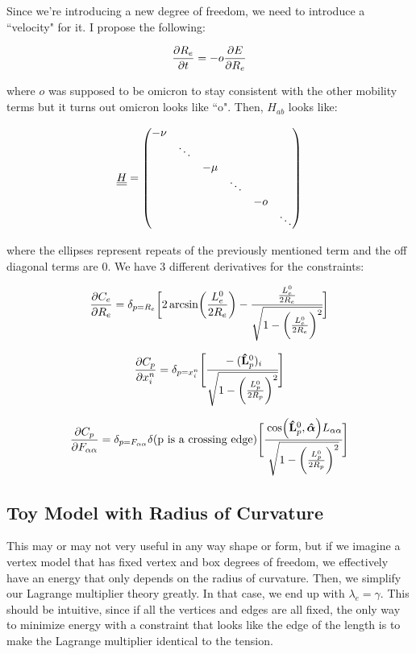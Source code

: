 \documentclass[12pt]{article}
\begin{document}
Since we're introducing a new degree of freedom, we need to introduce a ``velocity" for it. I propose the following:
\begin{center}
\begin{equation}
\pdv{R_e}{t} = -o \pdv{E}{R_e}
\end{equation}
\end{center}
where $o$ was supposed to be omicron to stay consistent with the other mobility terms but it turns out omicron looks like ``o". Then, $H_{ab}$ looks like:
\begin{center}
\begin{equation}
\underline{\underline{H}} = \mqty(\dmat{-\nu, \ddots, -\mu, \ddots, -o, \ddots})
\end{equation}
\end{center}
where the ellipses represent repeats of the previously mentioned term and the off diagonal terms are $0$. We have 3 different derivatives for the constraints:
\begin{center}
\begin{equation}
\pdv{C_e}{R_e} = \delta_{p = R_e} \bigg[2 \arcsin(\frac{L_e^0}{2 R_e}) - \cfrac{\frac{L_e^0}{2 R_e}}{\sqrt{1-\bigg(\frac{L_e^0}{2 R_e}\bigg)^2}}\bigg]
\end{equation}
\end{center}
\begin{center}
\begin{equation}
\pdv{C_p}{x_i^n} = \delta_{p = x_i^n} \Bigg[\cfrac{-(\vu{L}_p^0)_i}{\sqrt{1-\bigg(\frac{L_p^0}{2 R_p}\bigg)^2}}\Bigg]
\end{equation}
\end{center}
\begin{center}
\begin{equation}
\pdv{C_p}{F_{\alpha\alpha}} = \delta_{p=F_{\alpha\alpha}} \delta(\text{p is a crossing edge})\Bigg[\cfrac{\cos(\vu{L}_p^0, \vu*{\alpha}) L_{\alpha\alpha}}{\sqrt{1-\bigg(\frac{L_p^0}{2 R_p}\bigg)^2}}\Bigg]
\end{equation}
\end{center}
\subsection{Toy Model with Radius of Curvature}
This may or may not very useful in any way shape or form, but if we imagine a vertex model that has fixed vertex and box degrees of freedom, we effectively have an energy that only depends on the radius of curvature.  Then, we simplify our Lagrange multiplier theory greatly. In that case, we end up with $\lambda_e = \gamma$. This should be intuitive, since if all the vertices and edges are all fixed, the only way to minimize energy with a constraint that looks like the edge of the length is to make the Lagrange multiplier identical to the tension.
\end{document}
